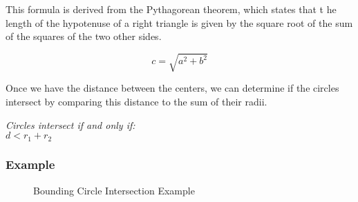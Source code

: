This formula is derived from the Pythagorean theorem, which states that t he
length of the hypotenuse of a right triangle is given by the square root of the
sum of the squares of the two other sides.

\begin{equation}
    c = \sqrt{a^2 + b^2}
\end{equation}

Once we have the distance between the centers, we can determine if the circles
intersect by comparing this distance to the sum of their radii.

\begin{center}
    \textit{Circles intersect if and only if:}\\
    $d < r_1 + r_2$
\end{center}

\subsubsection{Example}
\begin{figure}[H]
    \begin{center}

        \caption{Bounding Circle Intersection Example}
    \end{center}
\end{figure}

